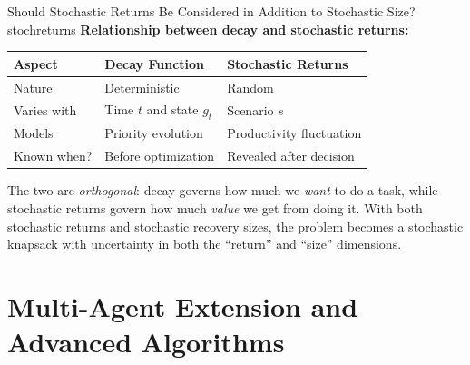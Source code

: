 \documentclass[11pt,a4paper]{article}
\begin{document}
\begin{questionbox}{Should Stochastic Returns Be Considered in Addition to Stochastic Size?}{stochreturns}
\textbf{Relationship between decay and stochastic returns:}

\begin{center}
\begin{tabular}{lll}
\toprule
Aspect & Decay Function & Stochastic Returns \\
\midrule
Nature & Deterministic & Random \\
Varies with & Time $t$ and state $g_t$ & Scenario $s$ \\
Models & Priority evolution & Productivity fluctuation \\
Known when? & Before optimization & Revealed after decision \\
\bottomrule
\end{tabular}
\end{center}

The two are \textit{orthogonal}: decay governs how much we \textit{want} to do a task, while stochastic returns govern how much \textit{value} we get from doing it. With both stochastic returns and stochastic recovery sizes, the problem becomes a stochastic knapsack with uncertainty in both the ``return'' and ``size'' dimensions.
\end{questionbox}

\section{Multi-Agent Extension and Advanced Algorithms}
\end{document}
